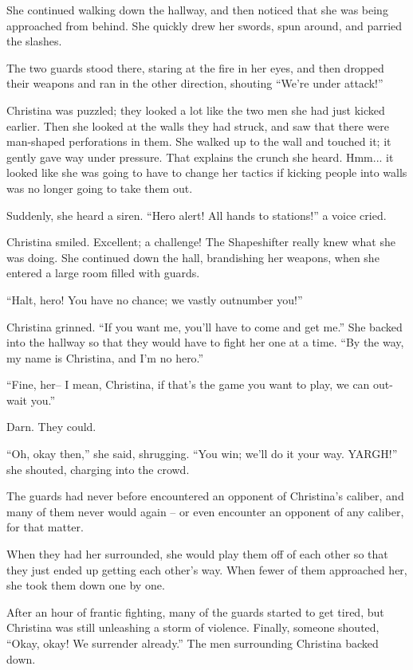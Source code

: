 \documentclass[showtrims,b6paper,draft,10pt]{memoir}
\begin{document}
She continued walking down the hallway, and then noticed that she was being approached from behind.  She quickly drew her swords, spun around, and parried the slashes.

The two guards stood there, staring at the fire in her eyes, and then dropped their weapons and ran in the other direction, shouting ``We're under attack!''

Christina was puzzled;  they looked a lot like the two men she had just kicked earlier.  Then she looked at the walls they had struck, and saw that there were man-shaped perforations in them.  She walked up to the wall and touched it;  it gently gave way under pressure.  That explains the crunch she heard.  Hmm... it looked like she was going to have to change her tactics if kicking people into walls was no longer going to take them out.

Suddenly, she heard a siren.  ``Hero alert!  All hands to stations!'' a voice cried.

Christina smiled.  Excellent;  a challenge!  The Shapeshifter really knew what she was doing.  She continued down the hall, brandishing her weapons, when she entered a large room filled with guards.

``Halt, hero!  You have no chance;  we vastly outnumber you!''

Christina grinned.  ``If you want me, you'll have to come and get me.''  She backed into the hallway so that they would have to fight her one at a time.  ``By the way, my name is Christina, and I'm no hero.''

``Fine, her-- I mean, Christina, if that's the game you want to play, we can out-wait you.''

Darn.  They could.

``Oh, okay then,'' she said, shrugging.  ``You win; we'll do it your way.  YARGH!'' she shouted, charging into the crowd.

The guards had never before encountered an opponent of Christina's caliber, and many of them never would again -- or even encounter an opponent of any caliber, for that matter.

When they had her surrounded, she would play them off of each other so that they just ended up getting each other's way.  When fewer of them approached her, she took them down one by one.

After an hour of frantic fighting, many of the guards started to get tired, but Christina was still unleashing a storm of violence.  Finally, someone shouted, ``Okay, okay!  We surrender already.''  The men surrounding Christina backed down.
\end{document}
